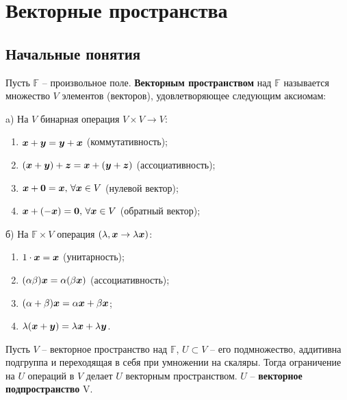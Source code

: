 \section{Векторные пространства}

\subsection{Начальные понятия}

\begin{to_def}
	Пусть $\mathbb{F}$ -- произвольное поле. \textbf{Векторным пространством} над $\mathbb{F}$ называется множество $V$ элементов (векторов), удовлетворяющее следующим аксиомам:

\begin{minipage}[t]{0.45\textwidth}
	\noindent
	a) На $V$ бинарная операция $V \times V \rightarrow V$:
	\begin{enumerate}[label = \Roman*.]
		\item $\mbox{\boldmath $x$} + \mbox{\boldmath $y$} = \mbox{\boldmath $y$} + \mbox{\boldmath $x$}$ (коммутативность);
		\item $(\mbox{\boldmath $x$} + \mbox{\boldmath $y$}) + \mbox{\boldmath $z$} = \mbox{\boldmath $x$} + (\mbox{\boldmath $y$} + \mbox{\boldmath $z$})$ (ассоциативность);
		\item $\mbox{\boldmath $x$} + \mbox{\boldmath $0$} = \mbox{\boldmath $x$}, \, \forall \mbox{\boldmath $x$}\in V$ (нулевой вектор);
		\item $\mbox{\boldmath $x$} + (-\mbox{\boldmath $x$}) = \mbox{\boldmath $0$}, \, \forall \mbox{\boldmath $x$} \in V$ (обратный вектор);
	\end{enumerate}
\end{minipage}
\hfill
\begin{minipage}[t]{0.45\textwidth}
	б) На $\mathbb{F} \times V$ операция $(\lambda, \mbox{\boldmath $x$} \rightarrow \lambda \mbox{\boldmath $x$})$:
	\begin{enumerate}[label = \Roman*., start = 5]
		\item $1 \cdot \mbox{\boldmath $x$} = \mbox{\boldmath $x$}$ (унитарность);
		\item $(\alpha \beta) \mbox{\boldmath $x$} = \alpha  (\beta \mbox{\boldmath $x$})$ (ассоциативность);
		\item $(\alpha + \beta) \mbox{\boldmath $x$} = \alpha \mbox{\boldmath $x$} + \beta \mbox{\boldmath $x$}$;
		\item $\lambda (\mbox{\boldmath $x$} +\mbox{\boldmath $y$}) = \lambda \mbox{\boldmath $x$} + \lambda \mbox{\boldmath $y$}$.
	\end{enumerate}
\end{minipage}
\end{to_def}

\begin{to_def}
	Пусть $V$ -- векторное пространство над $\mathbb{F}$, $U \subset V$ -- его подмножество, аддитивна подгруппа и переходящая в себя при умножении на скаляры. Тогда ограничение на $U$ операций в $V$ делает $U$ векторным пространством. $U$ -- \textbf{векторное подпространство} V.
\end{to_def}

